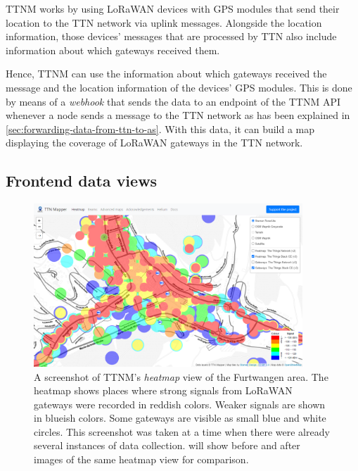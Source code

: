 \acl{TTNM} works by using \ac{LoRaWAN} devices with \ac{GPS} modules that send their location to the \ac{TTN} network via uplink messages.
Alongside the location information, those devices' messages that are processed by \ac{TTN} also include information about which gateways received them.

Hence, \acl{TTNM} can use the information about which gateways received the message and the location information of the devices' \ac{GPS} modules.
This is done by means of a \emph{webhook} that sends the data to an endpoint of the \acl{TTNM} \ac{API} whenever a node sends a message to the \ac{TTN} network as has been explained in \cref{sec:forwarding-data-from-ttn-to-as}.
With this data, it can build a map displaying the coverage of \ac{LoRaWAN} gateways in the \ac{TTN} network.

\subsection{Frontend data views}

\begin{figure}[htbp]
    \centering
    \includegraphics[width=0.9\textwidth]{pictures/ttn-mapper/heatmap_with_gateways.png}
    \caption{
        A screenshot of \ac{TTNM}'s \emph{heatmap} view of the Furtwangen area.
        The heatmap shows places where strong signals from \ac{LoRaWAN} gateways were recorded in reddish colors.
        Weaker signals are shown in blueish colors.
        Some gateways are visible as small blue and white circles.
        This screenshot was taken at a time when there were already several instances of data collection.
         will show before and after images of the same heatmap view for comparison.~\protect\cite{ttn_mapper_ttn_2023}
    }\label{pic:ttn-mapper-heatmap-with-gateways}
\end{figure}

